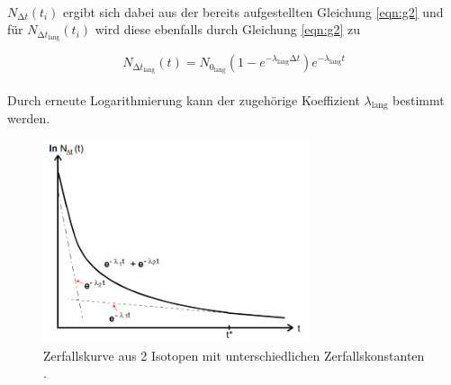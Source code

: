 \\
\begin{flushleft}
$N_{\increment t}(t_{i})$ ergibt sich dabei aus der bereits aufgestellten Gleichung \eqref{eqn:g2} und für $N_{{\increment t}_{\text{lang}}}(t_{i})$ wird diese ebenfalls durch Gleichung \eqref{eqn:g2} zu
\end{flushleft}
\begin{equation}
N_{\increment t_{\text{lang}}}(t) = N_{{0}_{\text{lang}}} (1-e^{-{\lambda}_{\text{lang}} \increment t}) e^{-{\lambda}_{\text{lang}} t}
\end{equation}
\\
Durch erneute Logarithmierung kann der zugehörige Koeffizient $\lambda_{\text{lang}}$ bestimmt werden. 
\begin{figure}
  \centering
  \includegraphics[width=0.7\textwidth]{bilder/AbbildungKurve.png}
  \caption{Zerfallskurve aus 2 Isotopen mit unterschiedlichen Zerfallskonstanten \cite{skript}.}
  \label{fig:AbbildungKurve}
\end{figure}
